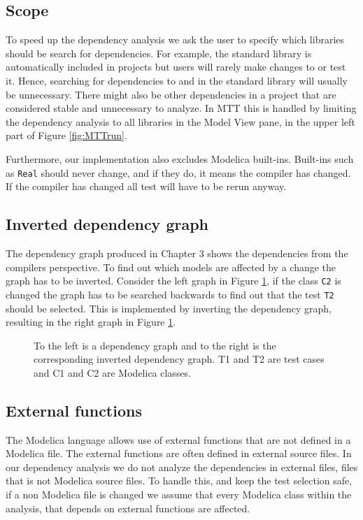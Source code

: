\documentclass{cslthse-msc}
\begin{document}
\subsection{Scope}
To speed up the dependency analysis we ask the user to specify which libraries should be search for dependencies. For example, the standard library is automatically included in projects but users will rarely make changes to or test it. Hence, searching for dependencies to and in the standard library will usually be unnecessary. There might also be other dependencies in a project that are considered stable and unnecessary to analyze. In MTT this is handled by limiting the dependency analysis to all libraries in the Model View pane, in the upper left part of Figure \ref{fig:MTTrun}.

Furthermore, our implementation also excludes Modelica built-ins. Built-ins such as \texttt{Real} should never change, and if they do, it means the compiler has changed. If the compiler has changed all test will have to be rerun anyway.

\subsection{Inverted dependency graph}
The dependency graph produced in Chapter 3 shows the dependencies from the compilers perspective. To find out which models are affected by a change the graph has to be inverted. Consider the left graph in Figure \ref{fig:invertedGraph}, if the class \texttt{C2} is changed the graph has to be searched backwards to find out that the test \texttt{T2} should be selected. This is implemented by inverting the dependency graph, resulting in the right graph in Figure \ref{fig:invertedGraph}.

\begin{figure}[!htbp]
    \centering
    \qquad
    \caption{To the left is a dependency graph and to the right is the corresponding inverted dependency graph. T1 and T2 are test cases and C1 and C2 are Modelica classes.}
    \label{fig:invertedGraph}
\end{figure}

\subsection{External functions}
The Modelica language allows use of external functions that are not defined in a Modelica file. The external functions are often defined in external source files\cite{modelicamodelica}. In our dependency analysis we do not analyze the dependencies in external files, files that is not Modelica source files. To handle this, and keep the test selection safe, if a non Modelica file is changed we assume that every Modelica class within the analysis, that depends on external functions are affected.
\end{document}

